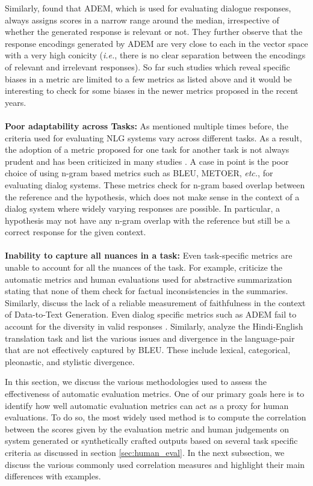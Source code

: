 Similarly,  found that ADEM, which is used for evaluating dialogue responses, always assigns scores in a narrow range around the median, irrespective of whether the generated response is relevant or not. They further observe that the response encodings generated by ADEM are very close to each in the vector space with a very high conicity (\textit{i.e.}, there is no clear separation between the encodings of relevant and irrelevant responses). So far such studies which reveal specific biases in a metric are limited to a few metrics as listed above and it would be interesting to check for some biases in the newer metrics proposed in the recent years. 
\\
\\
\textbf{Poor adaptability across Tasks: }
As mentioned multiple times before, the criteria used for evaluating NLG systems vary across different tasks. As a result, the adoption of a metric proposed for one task for another task is not always prudent and has been criticized in many studies . A case in point is the poor choice of using n-gram based metrics such as BLEU, METOER, \textit{etc.}, for evaluating dialog systems. These metrics check for n-gram based overlap between the reference and the hypothesis, which does not make sense in the context of a dialog system where widely varying responses are possible. In particular, a hypothesis may not have any n-gram overlap with the reference but still be a correct response for the given context.
\hfill \\\\
\textbf{Inability to capture all nuances in a task: }
Even task-specific metrics are unable to account for all the nuances of the task. For example,  criticize the automatic metrics and human evaluations used for abstractive summarization stating that none of them check for factual inconsistencies in the summaries. Similarly,  discuss the lack of a reliable measurement of faithfulness in the context of Data-to-Text Generation. Even dialog specific metrics such as ADEM fail to account for the diversity in valid responses . 
Similarly,  analyze the Hindi-English translation task and list the various issues and divergence in the language-pair that are not effectively captured by BLEU. These include lexical, categorical, pleonastic, and stylistic divergence.

\label{sec:evaluating_metrics}
In this section, we discuss the various methodologies used to assess the effectiveness of automatic evaluation metrics. One of our primary goals here is to identify how well automatic evaluation metrics can act as a proxy for human evaluations. To do so, the most widely used method is to compute the correlation between the scores given by the evaluation metric and human judgements on system generated or synthetically crafted outputs based on several task specific criteria as discussed in section \ref{sec:human_eval}. In the next subsection, we discuss the various commonly used correlation measures and highlight their main differences with examples.


